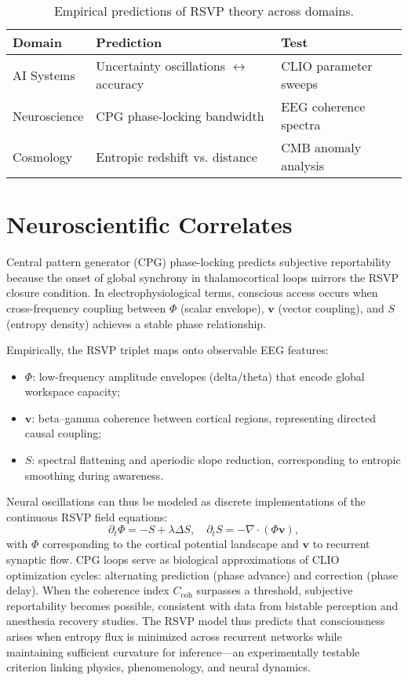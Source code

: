 \documentclass[12pt]{book}
\theoremstyle{definition}
\begin{document}
\begin{table}[H]
\centering
\begin{tabular}{p{2.5cm}p{4cm}p{4cm}}
\hline
\textbf{Domain} & \textbf{Prediction} & \textbf{Test} \\
\hline
AI Systems & Uncertainty oscillations $\leftrightarrow$ accuracy & CLIO parameter sweeps \\
Neuroscience & CPG phase-locking bandwidth & EEG coherence spectra \\
Cosmology & Entropic redshift vs. distance & CMB anomaly analysis \\
\hline
\end{tabular}
\caption{Empirical predictions of RSVP theory across domains.}
\label{tab:empirical}
\end{table}

\section{Neuroscientific Correlates}
Central pattern generator (CPG) phase-locking predicts subjective reportability because the onset of global synchrony in thalamocortical loops mirrors the RSVP closure condition.  
In electrophysiological terms, conscious access occurs when cross-frequency coupling between $\Phi$ (scalar envelope), $\mathbf{v}$ (vector coupling), and $S$ (entropy density) achieves a stable phase relationship.

Empirically, the RSVP triplet maps onto observable EEG features:
\begin{itemize}
  \item $\Phi$: low-frequency amplitude envelopes (delta/theta) that encode global workspace capacity;
  \item $\mathbf{v}$: beta–gamma coherence between cortical regions, representing directed causal coupling;
  \item $S$: spectral flattening and aperiodic slope reduction, corresponding to entropic smoothing during awareness.
\end{itemize}

Neural oscillations can thus be modeled as discrete implementations of the continuous RSVP field equations:
\begin{equation}
\partial_t \Phi = -S + \lambda \Delta S, \quad
\partial_t S = -\nabla \cdot (\Phi \mathbf{v}),
\end{equation}
with $\Phi$ corresponding to the cortical potential landscape and $\mathbf{v}$ to recurrent synaptic flow.  
CPG loops serve as biological approximations of CLIO optimization cycles: alternating prediction (phase advance) and correction (phase delay).  
When the coherence index $C_{\text{coh}}$ surpasses a threshold, subjective reportability becomes possible, consistent with data from bistable perception and anesthesia recovery studies.  
The RSVP model thus predicts that consciousness arises when entropy flux is minimized across recurrent networks while maintaining sufficient curvature for inference---an experimentally testable criterion linking physics, phenomenology, and neural dynamics.
\end{document}
